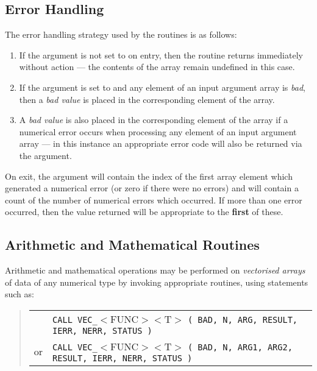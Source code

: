 \subsection{ Error Handling}
\label{section:vec:error}

The error handling strategy used by the  routines is as follows:

\begin{enumerate}

\item If the  argument is not set to  on
entry, then the routine returns immediately without action ---
the contents of the  array remain undefined in this case.

\item If the  argument is set to  and any
element of an input argument array is {\em bad}, then a {\em bad value} is
placed in the corresponding element of the  array.

\item A {\em bad value} is also placed in the corresponding element of the
 array if a numerical error occurs when processing any
element of an input argument array --- in this instance an appropriate
error code will also be returned via the  argument.

\end{enumerate}

On exit, the  argument will contain the index of the first
array element which generated a numerical error (or zero if there were no
errors) and  will contain a count of the number of
numerical errors which occurred.
If more than one error occurred, then the  value returned will
be appropriate to the {\bf first} of these.

\subsection{ Arithmetic and Mathematical Routines}

Arithmetic and mathematical operations may be performed on {\em vectorised
arrays} of data of any numerical type by invoking appropriate 
routines, using statements such as:

\begin{quote}
\begin{tabular}{rl}
& \verb#CALL VEC_#$<$FUNC$><$T$>$
\verb#( BAD, N, ARG, RESULT, IERR, NERR, STATUS )#\\
or & \verb#CALL VEC_#$<$FUNC$><$T$>$
\verb#( BAD, N, ARG1, ARG2, RESULT, IERR, NERR, STATUS )#
\end{tabular}
\end{quote}

